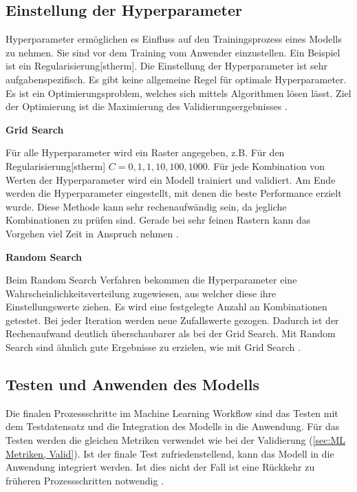 
\subsection{Einstellung der Hyperparameter} \label{sec:ML HyperPara}
\gls{Hyperparameter} ermöglichen es Einfluss auf den Trainingsprozess eines Modells zu nehmen. Sie sind vor dem Training vom Anwender einzustellen. Ein Beispiel ist ein \gls{Regularisierung}[stherm]. Die Einstellung der \gls{Hyperparameter} ist sehr aufgabenspezifisch. Es gibt keine allgemeine Regel für optimale \gls{Hyperparameter}. Es ist ein Optimierungsproblem, welches sich mittels Algorithmen lösen lässt. Ziel der Optimierung ist die Maximierung des Validierungsergebnisses \cite{Zheng.2015}.\dubpar


\textbf{Grid Search}\par

Für alle \gls{Hyperparameter} wird ein Raster angegeben, z.B. Für den \gls{Regularisierung}[stherm] \(C = {0,1,1,10,100,1000}\). Für jede Kombination von Werten der \gls{Hyperparameter} wird ein Modell trainiert und validiert. Am Ende werden die \gls{Hyperparameter} eingestellt, mit denen die beste Performance erzielt wurde. Diese Methode kann sehr rechenaufwändig sein, da jegliche Kombinationen zu prüfen sind. Gerade bei sehr feinen Rastern kann das Vorgehen viel Zeit in Anspruch nehmen \cite{Zheng.2015}.\dubpar

\textbf{Random Search}\par

Beim Random Search Verfahren bekommen die \gls{Hyperparameter} eine Wahrscheinlichkeitsverteilung zugewiesen, aus welcher diese ihre Einstellungswerte ziehen. Es wird eine festgelegte Anzahl an Kombinationen getestet. Bei jeder Iteration werden neue Zufallswerte gezogen. Dadurch ist der Rechenaufwand deutlich überschaubarer als bei der Grid Search. Mit Random Search sind ähnlich gute Ergebnisse zu erzielen, wie mit Grid Search \cite{Zheng.2015, Burkov.2019}.


\subsection{Testen und Anwenden des Modells}
Die finalen Prozessschritte im \gls{Machine Learning Workflow} sind das Testen mit dem \gls{Testdatensatz} und die Integration des Modells in die Anwendung. Für das Testen werden die gleichen Metriken verwendet wie bei der Validierung (\ref{sec:ML Metriken, Valid}). Ist der finale Test zufriedenstellend, kann das Modell in die Anwendung integriert werden. Ist dies nicht der Fall ist eine Rückkehr zu früheren Prozessschritten notwendig \cite{Zheng.2015, Burkov.2019}.